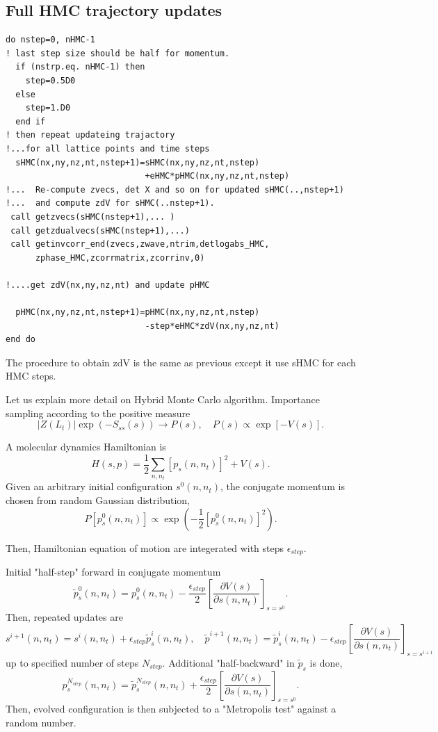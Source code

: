 \documentclass[10pt]{book}
\newcommand{\del}{\partial}
\begin{document}
\subsection{Full HMC trajectory updates}
\begin{lstlisting}[frame=single]
do nstep=0, nHMC-1
! last step size should be half for momentum.
  if (nstrp.eq. nHMC-1) then 
    step=0.5D0
  else
    step=1.D0
  end if   
! then repeat updateing trajactory
!...for all lattice points and time steps
  sHMC(nx,ny,nz,nt,nstep+1)=sHMC(nx,ny,nz,nt,nstep)
                            +eHMC*pHMC(nx,ny,nz,nt,nstep)
!...  Re-compute zvecs, det X and so on for updated sHMC(..,nstep+1)
!...  and compute zdV for sHMC(..nstep+1). 
 call getzvecs(sHMC(nstep+1),... )
 call getzdualvecs(sHMC(nstep+1),...)
 call getinvcorr_end(zvecs,zwave,ntrim,detlogabs_HMC, 
      zphase_HMC,zcorrmatrix,zcorrinv,0)

!....get zdV(nx,ny,nz,nt) and update pHMC

  pHMC(nx,ny,nz,nt,nstep+1)=pHMC(nx,ny,nz,nt,nstep)
                            -step*eHMC*zdV(nx,ny,nz,nt)
end do                            
\end{lstlisting}
The procedure to obtain zdV is the same as previous except it use sHMC for each HMC steps. 

Let us explain more detail on Hybrid Monte Carlo algorithm. 
Importance sampling according to the positive measure
$$ |Z(L_t)|\exp(-S_{ss}(s)) \to P(s),\quad P(s)\propto \exp[-V(s)].$$

A molecular dynamics Hamiltonian is
$$ H(s,p)=\frac{1}{2}\sum_{n,n_t} [p_s(n,n_t)]^2+V(s).$$
Given an arbitrary initial configuration $s^{0}(n,n_t)$,
the conjugate momentum is chosen from random Gaussian distribution,
$$ P[p_s^0(n,n_t)]\propto \exp(-\frac{1}{2}[p_s^0(n,n_t)]^2).$$

Then, Hamiltonian equation of motion are integerated with steps $\epsilon_{step}$.

Initial "half-step" forward in conjugate momentum
$$ \tilde{p}^0_s(n,n_t)=p_s^0(n,n_t)-\frac{\epsilon_{step}}{2}\left[ \frac{\del V(s)}{\del s(n,n_t)}\right]_{s=s^0}.
$$
Then, repeated updates are
$$ s^{i+1}(n,n_t)=s^i(n,n_t)+\epsilon_{step} \tilde{p}^i_s(n,n_t),
\quad \tilde{p}^{i+1}(n,n_t)=\tilde{p}_s^i(n,n_t)-\epsilon_{step}\left[ \frac{\del V(s)}{\del s(n,n_t)}\right]_{s=s^{i+1}} 
$$
up to specified number of steps $N_{step}$.
Additional "half-backward" in $\tilde{p}_s$ is done,
$$ p_s^{N_{step}}(n,n_t)=\tilde{p}^{N_{step}}_s(n,n_t)+\frac{\epsilon_{step}}{2}\left[ \frac{\del V(s)}{\del s(n,n_t)}\right]_{s=s^0}.$$
Then, evolved configuration is then subjected to a "Metropolis test"
against a random number. 
\end{document}
